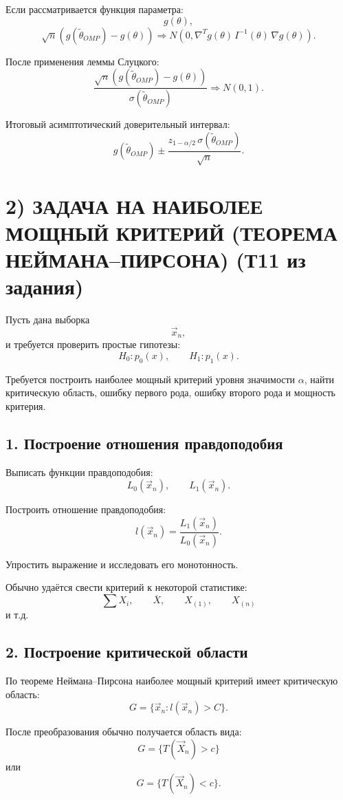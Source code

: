\documentclass{article}
\begin{document}
Если рассматривается функция параметра:
\[
g(\theta),
\]
\[
\sqrt n
\left(
g(\widetilde{\theta}_{OMP})-g(\theta)
\right)
\Rightarrow
N\left(
0,
\nabla^T g(\theta)\,
I^{-1}(\theta)\,
\nabla g(\theta)
\right).
\]

После применения леммы Слуцкого:
\[
\frac{
\sqrt n
(g(\widetilde{\theta}_{OMP})-g(\theta))
}{
\sigma(\widetilde{\theta}_{OMP})
}
\Rightarrow
N(0,1).
\]

Итоговый асимптотический доверительный интервал:
\[
g(\widetilde{\theta}_{OMP})
\pm
\frac{
z_{1-\alpha/2}\,
\sigma(\widetilde{\theta}_{OMP})
}{
\sqrt n
}.
\]





\section*{2) ЗАДАЧА НА НАИБОЛЕЕ МОЩНЫЙ КРИТЕРИЙ (ТЕОРЕМА НЕЙМАНА--ПИРСОНА) (Т11 из задания)}

Пусть дана выборка
\[
\vec x_n,
\]
и требуется проверить простые гипотезы:
\[
H_0 : p_0(x),
\qquad
H_1 : p_1(x).
\]

Требуется построить наиболее мощный критерий уровня значимости \(\alpha\), найти критическую область, ошибку первого рода, ошибку второго рода и мощность критерия.

\subsection*{1. Построение отношения правдоподобия}

Выписать функции правдоподобия:
\[
L_0(\vec x_n),
\qquad
L_1(\vec x_n).
\]

Построить отношение правдоподобия:
\[
l(\vec x_n)
=
\frac{L_1(\vec x_n)}
{L_0(\vec x_n)}.
\]

Упростить выражение и исследовать его монотонность.

Обычно удаётся свести критерий к некоторой статистике:
\[
\sum X_i,
\qquad
\overline X,
\qquad
X_{(1)},
\qquad
X_{(n)}
\]
и т.д.

\subsection*{2. Построение критической области}

По теореме Неймана--Пирсона наиболее мощный критерий имеет критическую область:
\[
G
=
\{
\vec x_n :
l(\vec x_n)>C
\}.
\]

После преобразования обычно получается область вида:
\[
G
=
\{
T(\vec X_n)>c
\}
\]
или
\[
G
=
\{
T(\vec X_n)<c
\}.
\]
\end{document}
